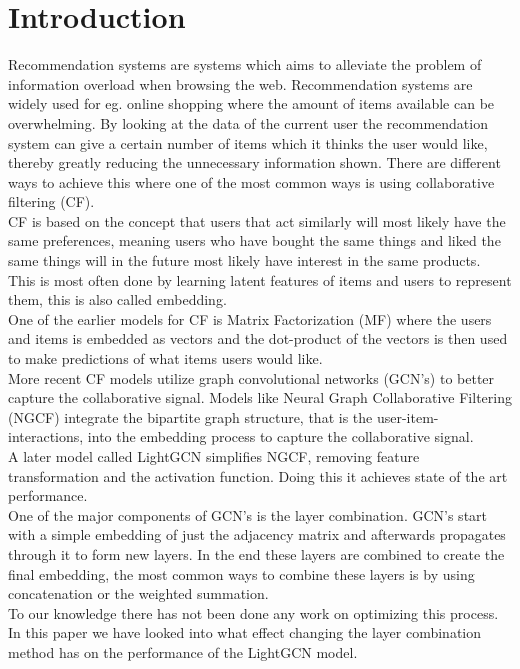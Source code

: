 \section{Introduction}
Recommendation systems are systems which aims to alleviate the problem of information overload when browsing the web.
Recommendation systems are widely used for eg. online shopping where the amount of items available can be overwhelming.
By looking at the data of the current user the recommendation system can give a certain number of items which it thinks the user would like, thereby greatly reducing the unnecessary information shown.
There are different ways to achieve this where one of the most common ways is using collaborative filtering (CF).
\\
CF is based on the concept that users that act similarly will most likely have the same preferences, meaning users who have bought the same things and liked the same things will in the future most likely have interest in the same products.
This is most often done by learning latent features of items and users to represent them, this is also called embedding.
\\
One of the earlier models for CF is Matrix Factorization (MF) where the users and items is embedded as vectors and the dot-product of the vectors is then used to make predictions of what items users would like\cite{Matrix-factorization-techniques}.
\\
More recent CF models utilize graph convolutional networks (GCN's) to better capture the collaborative signal.
Models like Neural Graph Collaborative Filtering (NGCF) integrate the bipartite graph structure, that is the user-item-interactions, into the embedding process to capture the collaborative signal\cite{NGCF_2019}.
\\
A later model called LightGCN simplifies NGCF, removing feature transformation and the activation function.
Doing this it achieves state of the art performance\cite{lightgcn}.
\\
One of the major components of GCN's is the layer combination.
GCN's start with a simple embedding of just the adjacency matrix and afterwards propagates through it to form new layers.
In the end these layers are combined to create the final embedding, the most common ways to combine these layers is by using concatenation or the weighted summation.
\\
To our knowledge there has not been done any work on optimizing this process.
In this paper we have looked into what effect changing the layer combination method has on the performance of the LightGCN model.

